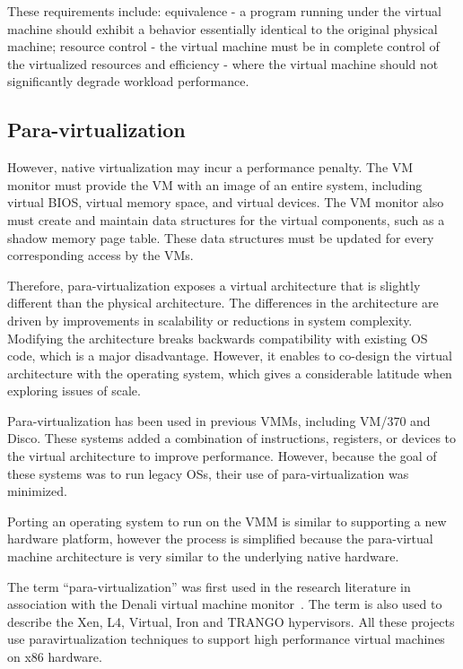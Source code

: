 These requirements include: equivalence - a program running under the virtual
machine should exhibit a behavior essentially identical to the original
physical machine; resource control - the virtual machine must be in complete
control of the virtualized resources and efficiency - where the virtual machine
should not significantly degrade workload performance.~\cite{wp-native-virt}

\subsection{Para-virtualization}

However, native virtualization may incur a performance penalty.  The VM monitor
must provide the VM with an image of an entire system, including virtual BIOS,
virtual memory space, and virtual devices. The VM monitor also must create and
maintain data structures for the virtual components, such as a shadow memory
page table. These data structures must be updated for every corresponding
access by the VMs.

Therefore, para-virtualization exposes a virtual architecture that is slightly
different than the physical architecture. The differences in the architecture
are driven by improvements in scalability or reductions in system complexity.
Modifying the architecture breaks backwards compatibility with existing OS
code, which is a major disadvantage. However, it enables to co-design the
virtual architecture with the operating system, which gives a considerable
latitude when exploring issues of scale.

Para-virtualization has been used in previous VMMs, including VM/370 and Disco.
These systems added a combination of instructions, registers, or devices to the
virtual architecture to improve performance. However, because the goal of these
systems was to run legacy OSs, their use of para-virtualization was
minimized.~\cite{denali}

Porting an operating system to run on the VMM is similar to supporting a new
hardware platform, however the process is simplified because the para-virtual
machine architecture is very similar to the underlying native hardware.

The term ``para-virtualization'' was first used in the research literature in
association with the Denali virtual machine monitor~\cite{denali}. The term
is also used to describe the Xen, L4, Virtual, Iron and TRANGO hypervisors. All
these projects use paravirtualization techniques to support high performance
virtual machines on x86 hardware.


